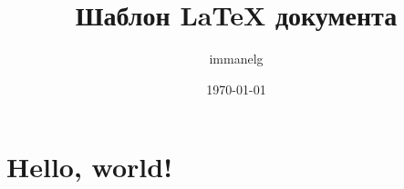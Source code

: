 \documentclass[a4paper,11pt]{extarticle}
\begin{document}
\title{Шаблон LaTeX документа}
\author{immanelg}
\date{\today}
\maketitle

\section*{Hello, world!}
\end{document}
